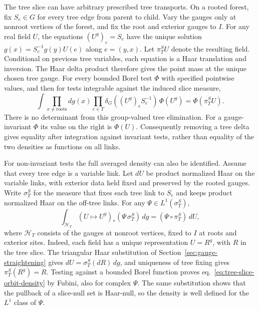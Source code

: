 \documentclass[11pt,letterpaper,reqno]{amsart}
\numberwithin{equation}{section}
\renewcommand{\eqref}[1]{\textup{eq.~\ref{#1}}}
\theoremstyle{definition}
\theoremstyle{remark}
\begin{document}
The tree slice can have arbitrary prescribed tree transports.
On a rooted forest, fix $S_e\in G$ for every tree edge from parent
to child. Vary the gauges only at nonroot vertices of the forest,
and fix the root and exterior gauges to \(I\).
For any real field $U$, the equations $(U^g)_e=S_e$ have the unique solution
$g(x)=S_e^{-1}g(y)U(e)$ along $e=(y,x)$.
Let $\pi_T^S U$ denote the resulting field. Conditional on previous
tree variables, each equation is a Haar translation and inversion.
The Haar delta product therefore gives the point mass at the unique
chosen tree gauge. For every bounded Borel test \(\Phi\) with specified
pointwise values, and then for tests integrable against the induced
slice measure,
\begin{equation}\label{eq:tree-target-delta}
 \int\prod_{x\ne\mathrm{roots}}dg(x)
   \prod_{e\in T}\delta_G((U^g)_e S_e^{-1})\,\Phi(U^g)
                       =\Phi(\pi_T^S U).
\end{equation}
There is no determinant from this group-valued tree elimination.
For a gauge-invariant $\Phi$ its value on the right is $\Phi(U)$.
Consequently removing a tree delta gives equality after integration
against invariant tests, rather than equality of the two densities
as functions on all links.

For non-invariant tests the full averaged density can also be identified.
Assume that every tree edge is a variable link. Let \(dU\) be product
normalized Haar on the variable links, with exterior data held fixed
and preserved by the rooted gauges. Write \(\sigma_T^S\) for the
measure that fixes each tree link to \(S_e\) and keeps product
normalized Haar on the off-tree links. For any
\(\Psi\in L^1(\sigma_T^S)\),
\begin{equation}\label{eq:tree-slice-orbit-density}
 \int_{\mathcal H_T}(U\mapsto U^g)_*(\Psi\,\sigma_T^S)\,dg
       =(\Psi\circ\pi_T^S)\,dU,
\end{equation}
where \(\mathcal H_T\) consists of the gauges at nonroot vertices,
fixed to \(I\) at roots and exterior sites. Indeed, each field has a
unique representation \(U=R^g\), with \(R\) in the tree slice.
The triangular Haar substitution of
Section~\ref{sec:gauge-straightening} gives
\(dU=\sigma_T^S(dR)\,dg\), and uniqueness of tree fixing gives
\(\pi_T^S(R^g)=R\). Testing against a bounded Borel function proves
\eqref{eq:tree-slice-orbit-density} by Fubini, also for complex
\(\Psi\). The same substitution shows that the pullback of a
slice-null set is Haar-null, so the density is well defined for
the \(L^1\) class of \(\Psi\).
\end{document}
